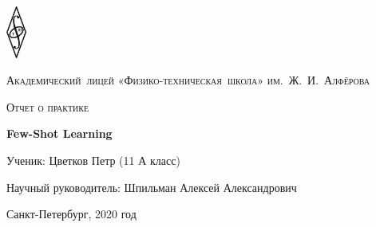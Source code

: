 \documentclass[a4paper, 12pt]{report}
\begin{document}
\begin{titlepage}
	\centering
	\includegraphics[width=0.05\textwidth]{pths}\par\vspace{0.5cm}
	{\scshape\Large  Академический~лицей «Физико-техническая~школа» им.~Ж.~И.~Алфёрова \par}
	\vspace{1.0cm}
	{\scshape\large Отчет о практике \par}
	\vspace{3cm}
	{\huge\bfseries  Few-Shot Learning \par}
	\vspace{3cm}
	{\large Ученик: Цветков Петр (11 А класс) \par}
	\vspace{0.25cm}
	{\large Научный руководитель: Шпильман Алексей Александрович \par}


	\vfill

	{\large Санкт-Петербург, 2020 год\par}
\end{titlepage}
	
	\begin{abstract}
	Few-Shot Learning (FSL) - активно исследуемая в наше время задача в области компьютерного зрения, подразумевающая классификацию изображений на основе малого числа примеров. В данной работе, помимо традиционного сценария FSL (5 классов, по 1 или 5 примеров на класс), рассматривается усложненная версия задачи, в котором количество классов много больше, чем число образцов для каждого класса (100 классов, по 5 примеров на класс), а так же задача применения опыта, полученного из одного датасета, к другому. Для этого был выбран метод решения, основанных на т. н. ProtoNet Classifier [ссылка]. Были проанализированы современные исследования в этой области, описанные в них модели реализованы, по-разному скомбинированы и протестированы в описанных сценариях. Для оценки использовался как популярный среди исследователей датасет miniImageNet [ссылка], так и собранный самостоятельно для этой задачи датасет, представляющий собой подмножество GoogleLandmarks [ссылка]. В результате работы были определены наиболее эффективные методы решения FSL для различных сценариев, что может быть полезно как при будущих исследованиях, так и при создании промышленных решений в области компьютерного зрения.
	\end{abstract}
	
\end{document}
